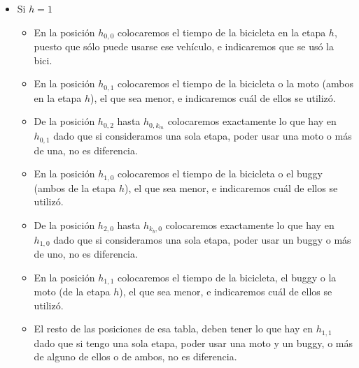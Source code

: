 \begin{itemize}
	\item Si $h = 1$
	\begin{itemize}
		\item En la posición $h_{0,0}$ colocaremos el tiempo de la bicicleta en la etapa $h$, puesto que sólo puede usarse ese vehículo, e indicaremos que se usó la bici.
		\item En la posición $h_{0,1}$ colocaremos el tiempo de la bicicleta o la moto (ambos en la etapa $h$), el que sea menor, e indicaremos cuál de ellos se utilizó.
		\item De la posición $h_{0,2}$ hasta $h_{0,k_{m}}$ colocaremos exactamente lo que hay en $h_{0,1}$ dado que si consideramos una sola etapa, poder usar una moto o más de una, no es diferencia.
		\item En la posición $h_{1,0}$ colocaremos el tiempo de la bicicleta o el buggy (ambos de la etapa $h$), el que sea menor, e indicaremos cuál de ellos se utilizó.
		\item De la posición $h_{2,0}$ hasta $h_{k_{b},0}$ colocaremos exactamente lo que hay en $h_{1,0}$ dado que si consideramos una sola etapa, poder usar un buggy o más de uno, no es diferencia.
		\item En la posición $h_{1,1}$ colocaremos el tiempo de la bicicleta, el buggy o la moto (de la etapa $h$), el que sea menor, e indicaremos cuál de ellos se utilizó.
		\item El resto de las posiciones de esa tabla, deben tener lo que hay en $h_{1,1}$ dado que si tengo una sola etapa, poder usar una moto y un buggy, o más de alguno de ellos o de ambos, no es diferencia.
	\end{itemize}


\end{itemize}
